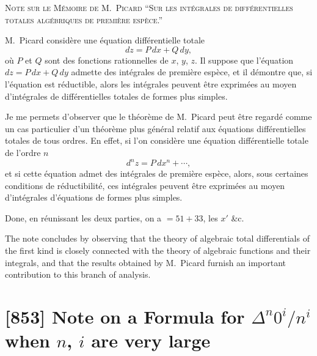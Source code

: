 \documentclass[11pt,a4paper]{book}
\begin{document}
\smallskip

\noindent\textsc{Note sur le M\'{e}moire de M.\ Picard ``Sur les int\'{e}grales de diff\'{e}rentielles totales alg\'{e}briques de premi\`{e}re esp\`{e}ce.''}

\medskip

\noindent M.\ Picard consid\`{e}re une \'{e}quation diff\'{e}rentielle totale
\[
dz = P\,dx + Q\,dy,
\]
o\`{u} $P$ et $Q$ sont des fonctions rationnelles de $x$, $y$, $z$. Il suppose que l'\'{e}quation $dz = P\,dx + Q\,dy$ admette des int\'{e}grales de premi\`{e}re esp\`{e}ce, et il d\'{e}montre que, si l'\'{e}quation est r\'{e}ductible, alors les int\'{e}grales peuvent \^{e}tre exprim\'{e}es au moyen d'int\'{e}grales de diff\'{e}rentielles totales de formes plus simples.

\smallskip

\noindent Je me permets d'observer que le th\'{e}or\`{e}me de M.\ Picard peut \^{e}tre regard\'{e} comme un cas particulier d'un th\'{e}or\`{e}me plus g\'{e}n\'{e}ral relatif aux \'{e}quations diff\'{e}rentielles totales de tous ordres. En effet, si l'on consid\`{e}re une \'{e}quation diff\'{e}rentielle totale de l'ordre $n$
\[
d^{n}z = P\,dx^{n} + \cdots,
\]
et si cette \'{e}quation admet des int\'{e}grales de premi\`{e}re esp\`{e}ce, alors, sous certaines conditions de r\'{e}ductibilit\'{e}, ces int\'{e}grales peuvent \^{e}tre exprim\'{e}es au moyen d'int\'{e}grales d'\'{e}quations de formes plus simples.

\smallskip

\noindent Done, en r\'{e}unissant les deux parties, on a $= 51 + 33$, les $x'$ \&c.

\medskip

\noindent The note concludes by observing that the theory of algebraic total differentials of the first kind is closely connected with the theory of algebraic functions and their integrals, and that the results obtained by M.\ Picard furnish an important contribution to this branch of analysis.

\newpage
\section*{[853] Note on a Formula for $\Delta^{n}0^{i}/n^{i}$ when $n$, $i$ are very large}
\end{document}
